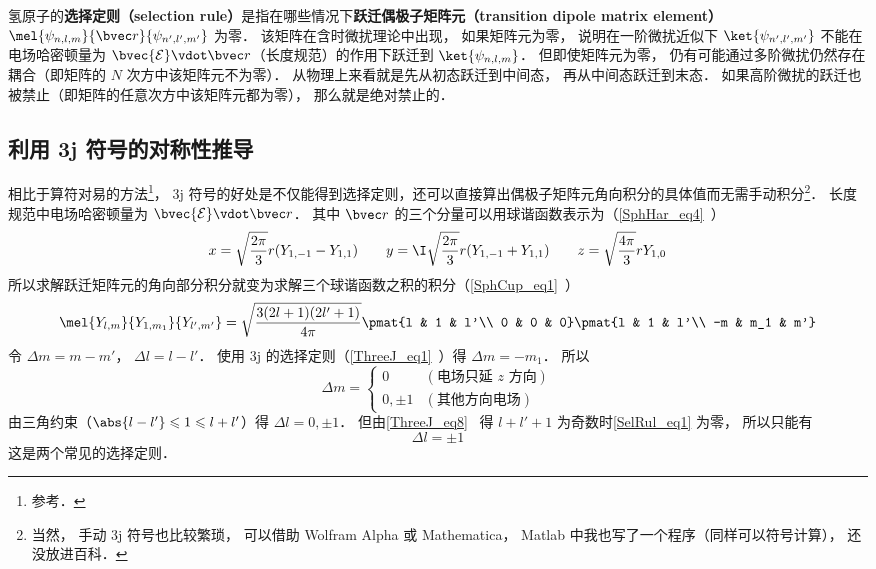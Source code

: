 
\begin{issues}
\issueDraft
\end{issues}


氢原子的\textbf{选择定则（selection rule）}是指在哪些情况下\textbf{跃迁偶极子矩阵元（transition dipole matrix element）} $\mel{\psi_{n,l,m}}{\bvec r}{\psi_{n',l',m'}}$ 为零． 该矩阵在含时微扰理论中出现， 如果矩阵元为零， 说明在一阶微扰近似下 $\ket{\psi_{n',l',m'}}$ 不能在电场哈密顿量为 $\bvec{\mathcal{E}}\vdot \bvec r$（长度规范）的作用下跃迁到 $\ket{\psi_{n,l,m}}$． 但即使矩阵元为零， 仍有可能通过多阶微扰仍然存在耦合（即矩阵的 $N$ 次方中该矩阵元不为零）． 从物理上来看就是先从初态跃迁到中间态， 再从中间态跃迁到末态． 如果高阶微扰的跃迁也被禁止（即矩阵的任意次方中该矩阵元都为零）， 那么就是绝对禁止的． %

\subsection{利用 3j 符号的对称性推导}
相比于算符对易的方法\footnote{参考\cite{GriffQ}．}， 3j 符号的好处是不仅能得到选择定则，还可以直接算出偶极子矩阵元角向积分的具体值而无需手动积分\footnote{当然， 手动 3j 符号也比较繁琐， 可以借助 Wolfram Alpha 或 Mathematica， Matlab 中我也写了一个程序（同样可以符号计算）， 还没放进百科．}． 长度规范中电场哈密顿量为 $\bvec{\mathcal{E}}\vdot \bvec r$． 其中 $\bvec r$ 的三个分量可以用球谐函数表示为（\autoref{SphHar_eq4}~）
\begin{equation}
x = \sqrt{\frac{2\pi}{3}} r (Y_{1,-1} - Y_{1,1}) \qquad
y = \I \sqrt{\frac{2\pi}{3}} r (Y_{1,-1}+Y_{1,1}) \qquad
z = \sqrt{\frac{4\pi}{3}} rY_{1,0}
\end{equation}
所以求解跃迁矩阵元的角向部分积分就变为求解三个球谐函数之积的积分（\autoref{SphCup_eq1}~）
\begin{equation}\label{SelRul_eq1}
\mel{Y_{l,m}}{Y_{1,m_1}}{Y_{l',m'}} = \sqrt{\frac{3(2l+1)(2l'+1)}{4\pi}} \pmat{l & 1 & l'\\ 0 & 0 & 0}\pmat{l & 1 & l'\\ -m & m_1 & m'}
\end{equation}
令 $\Delta m = m - m'$， $\Delta l = l - l'$． 使用 3j 的选择定则（\autoref{ThreeJ_eq1}~）得 $\Delta m = -m_1$． 所以
\begin{equation}
\Delta m =
\begin{cases}
0 & (\text{电场只延 $z$ 方向}) \\
0, \pm 1 & (\text{其他方向电场})
\end{cases}
\end{equation}
由三角约束（$\abs{l-l'} \leqslant 1 \leqslant l + l'$）得 $\Delta l = 0, \pm 1$． 但由\autoref{ThreeJ_eq8}~ 得 $l + l' + 1$ 为奇数时\autoref{SelRul_eq1} 为零， 所以只能有
\begin{equation}\label{SelRul_eq2}
 \Delta l = \pm 1
\end{equation}
这是两个常见的选择定则．

